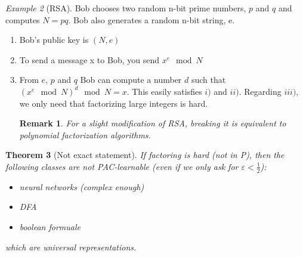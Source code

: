 \documentclass[12pt, letterpaper]{article}
\numberwithin{equation}{section} %
\newcommand{\ve}{\varepsilon}
\newtheorem{theorem}{Theorem}[section]
\newtheorem{remark}[theorem]{Remark}
\theoremstyle{definition}
\theoremstyle{remark}
\newtheorem{example}[theorem]{Example}
\begin{document}
\begin{example}[RSA]
Bob chooses two random n-bit prime numbers, $p$ and $q$ and computes $N=pq$. Bob also generates a random n-bit string, e.
\begin{enumerate}
\item Bob's public key is $(N, e)$
\item To send a message x to Bob, you send $x^e\mod N$
\item From $e$, $p$ and $q$ Bob can compute a number $d$ such that $(x^e \mod N)^d \mod N = x$.
This easily satisfies $i)$ and $ii)$. Regarding $iii)$, we only need that factorizing large integers is hard.
\begin{remark}
For a slight modification of RSA, breaking it is equivalent to polynomial factorization algorithms.
\end{remark}
\end{enumerate}
\end{example}

\begin{theorem}[Not exact statement]
If factoring is hard (not in P), then the following classes are not PAC-learnable (even if we only  ask for $\ve < \frac12$):
\begin{itemize}
\item neural networks (complex enough)
\item DFA
\item boolean formuale
\end{itemize}
which are universal representations.
\end{theorem}
\end{document}
